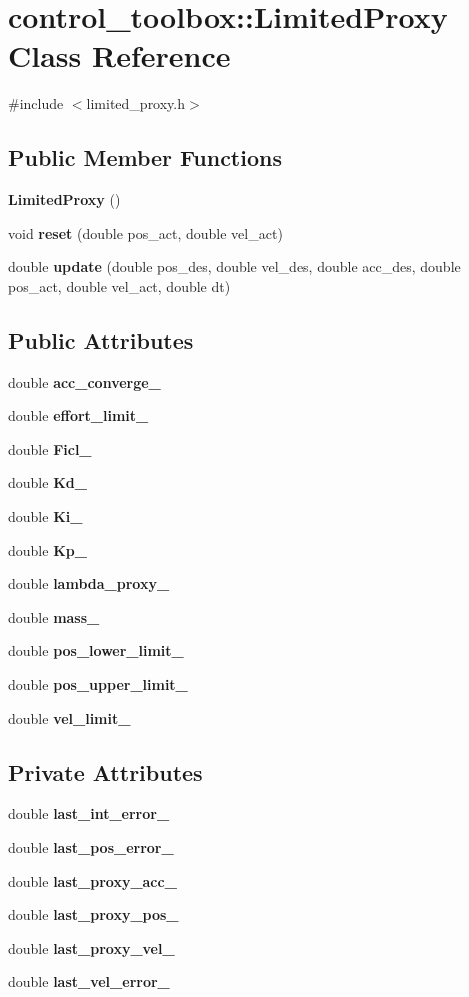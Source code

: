 \section{control\-\_\-toolbox\-:\-:\-Limited\-Proxy \-Class \-Reference}
\label{classcontrol__toolbox_1_1LimitedProxy}


{\ttfamily \#include $<$limited\-\_\-proxy.\-h$>$}

\subsection*{\-Public \-Member \-Functions}
\begin{DoxyCompactItemize}
\item 
{\bf \-Limited\-Proxy} ()
\item 
void {\bf reset} (double pos\-\_\-act, double vel\-\_\-act)
\item 
double {\bf update} (double pos\-\_\-des, double vel\-\_\-des, double acc\-\_\-des, double pos\-\_\-act, double vel\-\_\-act, double dt)
\end{DoxyCompactItemize}
\subsection*{\-Public \-Attributes}
\begin{DoxyCompactItemize}
\item 
double {\bf acc\-\_\-converge\-\_\-}
\item 
double {\bf effort\-\_\-limit\-\_\-}
\item 
double {\bf \-Ficl\-\_\-}
\item 
double {\bf \-Kd\-\_\-}
\item 
double {\bf \-Ki\-\_\-}
\item 
double {\bf \-Kp\-\_\-}
\item 
double {\bf lambda\-\_\-proxy\-\_\-}
\item 
double {\bf mass\-\_\-}
\item 
double {\bf pos\-\_\-lower\-\_\-limit\-\_\-}
\item 
double {\bf pos\-\_\-upper\-\_\-limit\-\_\-}
\item 
double {\bf vel\-\_\-limit\-\_\-}
\end{DoxyCompactItemize}
\subsection*{\-Private \-Attributes}
\begin{DoxyCompactItemize}
\item 
double {\bf last\-\_\-int\-\_\-error\-\_\-}
\item 
double {\bf last\-\_\-pos\-\_\-error\-\_\-}
\item 
double {\bf last\-\_\-proxy\-\_\-acc\-\_\-}
\item 
double {\bf last\-\_\-proxy\-\_\-pos\-\_\-}
\item 
double {\bf last\-\_\-proxy\-\_\-vel\-\_\-}
\item 
double {\bf last\-\_\-vel\-\_\-error\-\_\-}
\end{DoxyCompactItemize}


